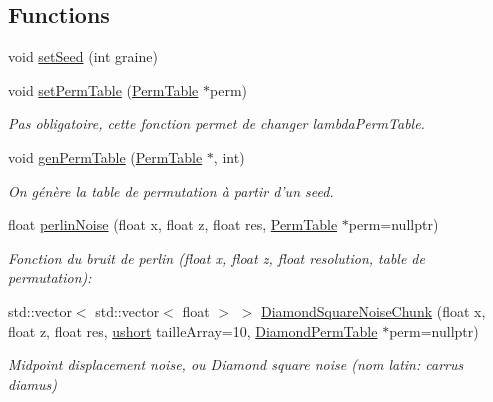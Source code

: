 \subsection*{Functions}
\begin{DoxyCompactItemize}
\item 
void \hyperlink{namespace_unoise_a5dbbb2ae6c75efd29abd5663db08ec0e}{set\-Seed} (int graine)
\item 
void \hyperlink{namespace_unoise_aa8daebdaad2fc5a125cd7b1acc7a38b4}{set\-Perm\-Table} (\hyperlink{namespace_unoise_ae11142038f2dd1bea2711b2b99bbfaf6}{Perm\-Table} $\ast$perm)
\begin{DoxyCompactList}\small\item\em Pas obligatoire, cette fonction permet de changer lambda\-Perm\-Table. \end{DoxyCompactList}\item 
void \hyperlink{namespace_unoise_a5a1dbb7caee818c615fdfedc2ff19730}{gen\-Perm\-Table} (\hyperlink{namespace_unoise_ae11142038f2dd1bea2711b2b99bbfaf6}{Perm\-Table} $\ast$, int)
\begin{DoxyCompactList}\small\item\em On génère la table de permutation à partir d'un seed. \end{DoxyCompactList}\item 
float \hyperlink{namespace_unoise_a77b87fa88183eb7081d3ea602989c59e}{perlin\-Noise} (float x, float z, float res, \hyperlink{namespace_unoise_ae11142038f2dd1bea2711b2b99bbfaf6}{Perm\-Table} $\ast$perm=nullptr)
\begin{DoxyCompactList}\small\item\em Fonction du bruit de perlin (float x, float z, float resolution, table de permutation)\-: \end{DoxyCompactList}\item 
std\-::vector$<$ std\-::vector$<$ float $>$ $>$ \hyperlink{namespace_unoise_ad0e2cb05c23e202b63306e4f2adfb566}{Diamond\-Square\-Noise\-Chunk} (float x, float z, float res, \hyperlink{utilities_8h_ab95f123a6c9bcfee6a343170ef8c5f69}{ushort} taille\-Array=10, \hyperlink{struct_unoise_1_1_diamond_perm_table}{Diamond\-Perm\-Table} $\ast$perm=nullptr)
\begin{DoxyCompactList}\small\item\em Midpoint displacement noise, ou Diamond square noise (nom latin\-: carrus diamus) \end{DoxyCompactList}\end{DoxyCompactItemize}
